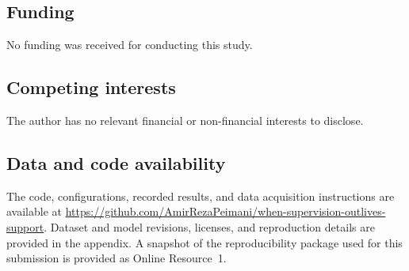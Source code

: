 \documentclass[pdflatex,sn-basic,Numbered]{sn-jnl}
\begin{document}
\subsection*{Funding}
No funding was received for conducting this study.
\subsection*{Competing interests}
The author has no relevant financial or non-financial interests to disclose.

\subsection*{Data and code availability}
The code, configurations, recorded results, and data acquisition instructions are available at
\url{https://github.com/AmirRezaPeimani/when-supervision-outlives-support}.
Dataset and model revisions, licenses, and reproduction details are provided in the appendix.
A snapshot of the reproducibility package used for this submission is provided as Online Resource~1.
\end{document}
